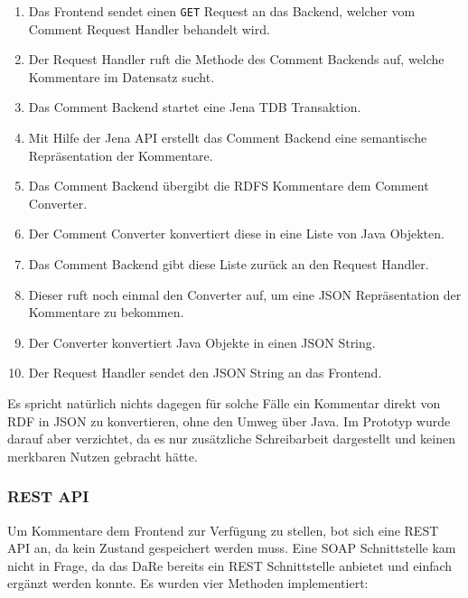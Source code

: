 \documentclass[
	headsepline,
	footsepline,
	fontsize=12pt,
	bibliography=totoc
]{scrbook}
\begin{document}
\begin{enumerate}
	\item Das Frontend sendet einen \texttt{GET} Request an das Backend, welcher vom Comment Request Handler behandelt wird.
	\item Der Request Handler ruft die Methode des Comment Backends auf, welche Kommentare im Datensatz sucht.
	\item Das Comment Backend startet eine Jena TDB Transaktion.
	\item Mit Hilfe der Jena API erstellt das Comment Backend eine semantische Repräsentation der Kommentare.
	\item Das Comment Backend übergibt die RDFS Kommentare dem Comment Converter.
	\item Der Comment Converter konvertiert diese in eine Liste von Java Objekten.
	\item Das Comment Backend gibt diese Liste zurück an den Request Handler.
	\item Dieser ruft noch einmal den Converter auf, um eine JSON Repräsentation der Kommentare zu bekommen.
	\item Der Converter konvertiert Java Objekte in einen JSON String.
	\item Der Request Handler sendet den JSON String an das Frontend.
\end{enumerate}

Es spricht natürlich nichts dagegen für solche Fälle ein Kommentar direkt von RDF in JSON zu konvertieren, ohne den Umweg über Java. Im Prototyp wurde darauf aber verzichtet, da es nur zusätzliche Schreibarbeit dargestellt und keinen merkbaren Nutzen gebracht hätte.

\subsubsection{REST API}

Um Kommentare dem Frontend zur Verfügung zu stellen, bot sich eine REST API an, da kein Zustand gespeichert werden muss. Eine SOAP Schnittstelle kam nicht in Frage, da das DaRe bereits ein REST Schnittstelle anbietet und einfach ergänzt werden konnte. Es wurden vier Methoden implementiert:
\end{document}
